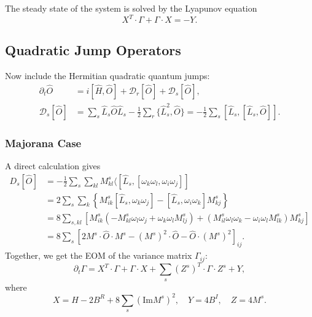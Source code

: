 \documentclass[aps,prx,superscriptaddress,nofootinbib]{revtex4}
\begin{document}
The steady state of the system is solved by the Lyapunov equation
\begin{equation}
	X^T\cdot\Gamma + \Gamma \cdot X = - Y.
\end{equation}


\subsection{Quadratic Jump Operators}

Now include the Hermitian quadratic quantum jumps:
\begin{equation}
\begin{aligned}
	\partial_t \hat O &= i[\hat H, \hat O] + \mathcal D_r[\hat O] + \mathcal D_s[\hat O], \\
	\mathcal D_s[\hat O] 
	&= \sum_s \hat L_s \hat O\hat L_s - \frac{1}{2} \sum_r\{\hat L_s^2, \hat O \}
	= -\frac{1}{2} \sum_s [\hat L_s,[\hat L_s,\hat O]].
\end{aligned}
\end{equation}

\subsubsection{Majorana Case}
A direct calculation gives
\begin{equation*}
\begin{aligned}
	D_s[\hat O]
	&= -\frac{1}{2} \sum_s \sum_{kl} M^s_{kl}\langle[\hat L_s,[\omega_k \omega_l, \omega_i \omega_j]] \\
	&= 2\sum_s \sum_{k} \left\{ M^s_{ik}[\hat L_s,\omega_k \omega_j]-[\hat L_s,\omega_i \omega_k]M^s_{kj} \right\} \\
	&= 8\sum_{s,kl} \left[ M^s_{ik}(-M^s_{kl}\omega_l\omega_j+\omega_k\omega_l M^s_{lj})+(M^s_{il}\omega_l\omega_k-\omega_i\omega_l M^s_{lk})M^s_{kj} \right] \\
	&= 8\sum_s \left[2 M^s \cdot\hat O\cdot M^s-(M^s)^2 \cdot \hat O - \hat O\cdot(M^s)^2 \right]_{ij}.
\end{aligned}
\end{equation*}
Together, we get the EOM of the variance matrix $\Gamma_{ij}$:
\begin{equation}
	\partial_t \Gamma = X^T\cdot\Gamma + \Gamma \cdot X + \sum_s (Z^s)^T \cdot \Gamma\cdot Z^s + Y,
\end{equation}
where
\begin{equation}
	X = H - 2B^R + 8 \sum_s (\mathrm{Im} M^s)^2, \quad
	Y = 4B^I, \quad 
	Z = 4 M^s.
\end{equation}
\end{document}
